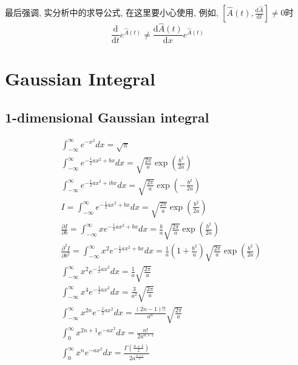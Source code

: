 最后强调, 实分析中的求导公式, 在这里要小心使用, 例如, $\left[\hat{A}(t),\frac{\mathrm{d}\hat{A}}{\mathrm{d}t}\right]\neq 0$时
\[\frac{\mathrm{d} }{\mathrm{d} t}e^{\hat{A}(t) }\neq\frac{\mathrm{d} \hat{A}(t)}{\mathrm{d} x}e^{\hat{A}(t) }\]















\chapter{Gaussian Integral}
\section*{1-dimensional Gaussian integral}
\begin{center}
    \begin{equation*}
        \begin{aligned}
            &\int_{-\infty}^{\infty} e^{-x^{2}} d x=\sqrt{\pi}\\
            &\int_{-\infty}^{\infty} e^{-\frac{1}{2} a x^{2}+b x} d x=\sqrt{\frac{2 \pi}{a}} \exp \left(\frac{b^{2}}{2 a}\right)\\
            &\int_{-\infty}^{\infty} e^{-\frac{1}{2} a x^{2}+i b x} d x=\sqrt{\frac{2 \pi}{a}} \exp \left(-\frac{b^{2}}{2 a}\right)\\
            &I=\int_{-\infty}^{\infty} e^{-\frac{1}{2} a x^{2}+b x} d x=\sqrt{\frac{2 \pi}{a}} \exp \left(\frac{b^{2}}{2 a}\right)\\
            &\frac{\partial I}{\partial b}=\int_{-\infty}^{\infty} x e^{-\frac{1}{2} a x^{2}+b x} d x=\frac{b}{a} \sqrt{\frac{2 \pi}{a}} \exp \left(\frac{b^{2}}{2 a}\right)\\
            &\frac{\partial^{2} I}{\partial b^{2}}=\int_{-\infty}^{\infty} x^{2} e^{-\frac{1}{2} a x^{2}+b x} d x=\frac{1}{a}\left(1+\frac{b^{2}}{a}\right) \sqrt{\frac{2 \pi}{a}} \exp \left(\frac{b^{2}}{2 a}\right)\\
            &\int_{-\infty}^{\infty} x^{2} e^{-\frac{1}{2} a x^{2}} d x=\frac{1}{a} \sqrt{\frac{2 \pi}{a}}\\
            &\int_{-\infty}^{\infty} x^{4} e^{-\frac{1}{2} a x^{2}} d x=\frac{3}{a^{2}} \sqrt{\frac{2 \pi}{a}}\\
            &\int_{-\infty}^{\infty} x^{2 n} e^{-\frac{1}{2} a x^{2}} d x=\frac{(2 n-1) ! !}{a^{n}} \sqrt{\frac{2 \pi}{a}}\\
            &\int_{0}^{\infty} x^{2 n+1} e^{-a x^{2}} d x=\frac{n !}{2 a^{n+1}}\\
            &\int_{0}^{\infty} x^{n} e^{-a x^{2}} d x=\frac{\Gamma\left(\frac{n+1}{2}\right)}{2 a^{\frac{n+1}{2}}}
        \end{aligned}
    \end{equation*}
\end{center}
